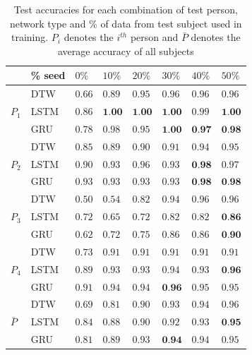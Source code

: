 \documentclass[10pt,twocolumn,letterpaper]{article}
\begin{document}
\begin{table}[h]
	\begin{center}
		\begin{tabular}{|m{1em} | m{3em} | m{1.5em} | m{1.5em} | m{1.5em} |m{1.5em} |m{1.5em} |m{1.5em} |}
			\hline
			& \% seed & $0\%$ & $10\%$ & $20\%$ & $30\%$ & $40\%$ & $50\%$\\
			\hline
			\multirow{3}{3.5em}{$P_1$}
			& DTW & $0.66$ & $0.89$ & $0.95$ & $0.96$ & $0.96$ & $0.96$\\
			\cline{2-8}
			& LSTM & $0.86$ & $\textbf{1.00}$ & $\textbf{1.00}$ & $\textbf{1.00}$ & $0.99$ & $\textbf{1.00}$\\
			\cline{2-8}
			& GRU & $0.78$ & $0.98$ & $0.95$ & $\textbf{1.00}$ & $\textbf{0.97}$ & $\textbf{0.98}$\\
			\hline
			\multirow{3}{3.5em}{$P_2$}
			& DTW & $0.85$ & $0.89$ & $0.90$ & $0.91$ & $0.94$ & $0.95$\\
			\cline{2-8}
			& LSTM & $0.90$ & $0.93$ & $0.96$ & $0.93$ & $\textbf{0.98}$ & $0.97$\\
			\cline{2-8}
			& GRU & $0.93$ & $0.93$ & $0.93$ & $0.93$ & $\textbf{0.98}$ & $\textbf{0.98}$\\
			\hline
			\multirow{3}{3.5em}{$P_3$}
			& DTW & $0.50$ & $0.54$ & $0.82$ & $0.94$ & $0.96$ & $0.96$\\
			\cline{2-8}
			& LSTM & $0.72$ & $0.65$ & $0.72$ & $0.82$ & $0.82$ & $\textbf{0.86}$\\
			\cline{2-8}
			& GRU & $0.62$ & $0.72$ & $0.75$ & $0.86$ & $0.86$ & $\textbf{0.90}$\\
			\hline
			\multirow{3}{3.5em}{$P_4$}
			& DTW & $0.73$ & $0.91$ & $0.91$ & $0.91$ & $0.91$ & $0.91$\\
			\cline{2-8}
			& LSTM & $0.89$ & $0.93$ & $0.93$ & $0.94$ & $0.93$ & $\textbf{0.96}$\\
			\cline{2-8}
			& GRU & $0.91$ & $0.94$ & $0.94$ & $\textbf{0.96}$ & $0.95$ & $0.95$\\
			\hline
			\multirow{3}{3.5em}{$\bar{P}$}
			& DTW & $0.69$ & $0.81$ & $0.90$ & $0.93$ & $0.94$ & $0.96$\\
			\cline{2-8}
			& LSTM & $0.84$ & $0.88$ & $0.90$ & $0.92$ & $0.93$ & $\textbf{0.95}$\\
			\cline{2-8}
			& GRU & $0.81$ & $0.89$ & $0.93$ & $\textbf{0.94}$ & $0.94$ & $0.95$\\
			\hline
		\end{tabular}
	\end{center}
	\caption{Test accuracies for each combination of test person, network type and \% of data from test subject used in training. $P_i$ denotes the $i^{th}$ person and $\bar{P}$ denotes the average accuracy of all subjects}
	\label{table:result_table}
\end{table}
\end{document}
